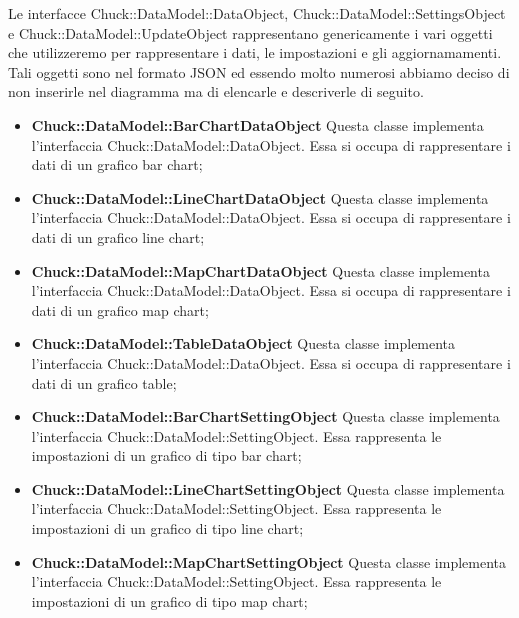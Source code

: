	Le interfacce Chuck::DataModel::DataObject, Chuck::DataModel::SettingsObject e \linebreak Chuck::DataModel::UpdateObject rappresentano genericamente i vari oggetti che utilizzeremo per rappresentare i dati, le impostazioni e gli aggiornamamenti. Tali oggetti sono nel formato JSON ed essendo molto numerosi abbiamo deciso di non inserirle nel diagramma ma di elencarle e descriverle di seguito.

	\begin{itemize}
		\item \textbf{Chuck::DataModel::BarChartDataObject} Questa classe implementa l'interfaccia \linebreak Chuck::DataModel::DataObject. Essa si occupa di rappresentare i dati di un grafico bar chart;

		\item \textbf{Chuck::DataModel::LineChartDataObject} Questa classe implementa l'interfaccia \linebreak Chuck::DataModel::DataObject. Essa si occupa di rappresentare i dati di un grafico line chart;

		\item \textbf{Chuck::DataModel::MapChartDataObject} Questa classe implementa l'interfaccia \linebreak Chuck::DataModel::DataObject. Essa si occupa di rappresentare i dati di un grafico map chart;

		\item \textbf{Chuck::DataModel::TableDataObject} Questa classe implementa l'interfaccia \linebreak Chuck::DataModel::DataObject. Essa si occupa di rappresentare i dati di un grafico table;

		\item \textbf{Chuck::DataModel::BarChartSettingObject} Questa classe implementa l'interfaccia \linebreak Chuck::DataModel::SettingObject. Essa rappresenta le impostazioni di un grafico di tipo bar chart;

		\item \textbf{Chuck::DataModel::LineChartSettingObject} Questa classe implementa l'interfaccia \linebreak Chuck::DataModel::SettingObject. Essa rappresenta le impostazioni di un grafico di tipo line chart;

		\item \textbf{Chuck::DataModel::MapChartSettingObject} Questa classe implementa l'interfaccia \linebreak Chuck::DataModel::SettingObject. Essa rappresenta le impostazioni di un grafico di tipo map chart;


\end{itemize}
